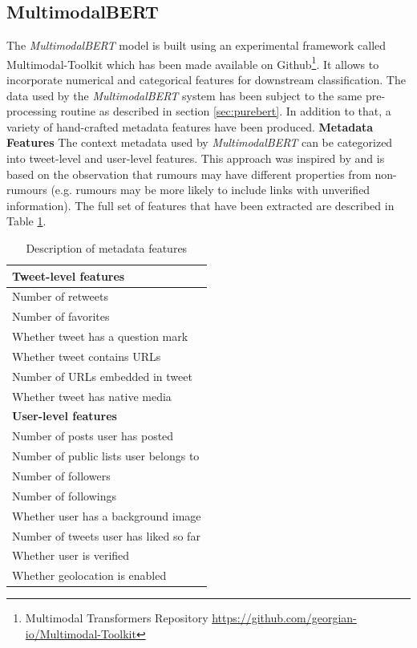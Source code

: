 \documentclass[11pt,a4paper]{article}
\begin{document}
\subsection{MultimodalBERT}
The \textit{MultimodalBERT} model is built using an experimental framework called Multimodal-Toolkit which has been made available on Github\footnote{Multimodal Transformers Repository \url{https://github.com/georgian-io/Multimodal-Toolkit}}. It allows to incorporate numerical and categorical features for downstream classification. 
\newline
The data used by the \textit{MultimodalBERT} system has been subject to the same pre-processing routine as described in section \ref{sec:purebert}. In addition to that, a variety of hand-crafted metadata features have been produced. 
\newline
\newline
\textbf{Metadata Features}
\newline
The context metadata used by \textit{MultimodalBERT} can be categorized into tweet-level and user-level features. This approach was inspired by \cite{RN668} and is based on the observation that rumours may have different properties from non-rumours (e.g. rumours may be more likely to include links with unverified information). The full set of features that have been extracted are described in Table \ref{tbl:handcrafted_features}.
\begin{table}
\centering
\begin{tabular}{l}
\hline 
\textbf{Tweet-level features} \\ \hline
Number of retweets \\
Number of favorites \\
Whether tweet has a question mark \\
Whether tweet contains URLs \\
Number of URLs embedded in tweet \\
Whether tweet has native media \\
\hline
\textbf{User-level features} \\ \hline
Number of posts user has posted \\
Number of public lists user belongs to \\
Number of followers \\
Number of followings \\
Whether user has a background image \\
Number of tweets user has liked so far \\
Whether user is verified\\
Whether geolocation is enabled \\
\hline
\end{tabular}
\caption{Description of metadata features}
\label{tbl:handcrafted_features} 
\end{table}
\end{document}
